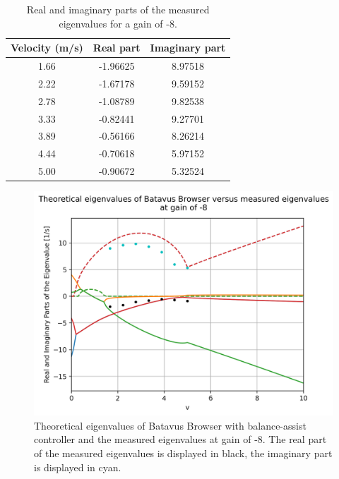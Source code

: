 \documentclass[12pt]{article}
\begin{document}
\begin{table}[]
    \centering
    \caption{Real and imaginary parts of the measured eigenvalues for a gain of -8.}
    \label{table-eigenvalues-gain-8}
    \begin{tabular}{c|c|c}
        \textbf{Velocity (m/s)} & \textbf{Real part} & \textbf{Imaginary part} \\ \hline
        1.66                    & -1.96625           & 8.97518                 \\
        2.22                    & -1.67178           & 9.59152                 \\
        2.78                    & -1.08789           & 9.82538                 \\
        3.33                    & -0.82441           & 9.27701                 \\
        3.89                    & -0.56166           & 8.26214                 \\
        4.44                    & -0.70618           & 5.97152                 \\
        5.00                    & -0.90672           & 5.32524                
    \end{tabular}
\end{table}

\begin{figure}
    \centering
    \includegraphics[width=\columnwidth]{figures/gain-8-batavus-without-rider.png}
    \caption{Theoretical eigenvalues of Batavus Browser with balance-assist controller and the measured eigenvalues at gain of -8. The real part of the measured eigenvalues is displayed in black, the imaginary part is displayed  in cyan.}
    \label{gain-8-batavus-without-rider}
\end{figure}
\end{document}
